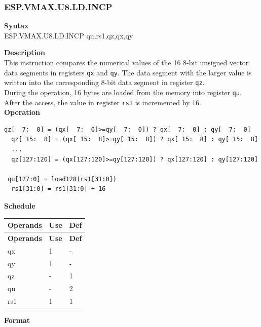 \newpage
\subsubsection{ESP.VMAX.U8.LD.INCP}\label{instruction:ESPVMAXU8LDINCP}
\textbf{Syntax}\\
ESP.VMAX.U8.LD.INCP qu,rs1,qz,qx,qy

\textbf{Description}\\
This instruction compares the numerical values of the 16 8-bit unsigned vector data segments in registers \lstinline{qx} and \lstinline{qy}. The data segment with the larger value is written into the corresponding 8-bit data segment in register \lstinline{qz}.\\During the operation, 16 bytes are loaded from the memory into register \lstinline{qu}. After the access, the value in register \lstinline{rs1} is incremented by 16.\\
\textbf{Operation}
\begin{lstlisting}[escapeinside=`?]
  qz[  7:  0] = (qx[  7:  0]>=qy[  7:  0]) ? qx[  7:  0] : qy[  7:  0]
  qz[ 15:  8] = (qx[ 15:  8]>=qy[ 15:  8]) ? qx[ 15:  8] : qy[ 15:  8]
  ...
  qz[127:120] = (qx[127:120]>=qy[127:120]) ? qx[127:120] : qy[127:120]

 qu[127:0] = load128(rs1[31:0])
  rs1[31:0] = rs1[31:0] + 16
\end{lstlisting}


\textbf{Schedule}\\
\begin{longtable}[c]{|l|l|l|}
    \hline
    \rowcolor{lightgray}
    \textbf{Operands} & \textbf{Use} & \textbf{Def} \\\hline
    \endfirsthead
    \hline
    \rowcolor{lightgray}
     \textbf{Operands} & \textbf{Use} & \textbf{Def} \\\hline
    \endhead
    \hline
    \endfoot

    qx & 1 & - \\\hline
  qy & 1 & - \\\hline
     qz & - & 1 \\\hline
     qu & - & 2 \\\hline
     rs1 & 1 & 1

\end{longtable}

\textbf{Format}\\

